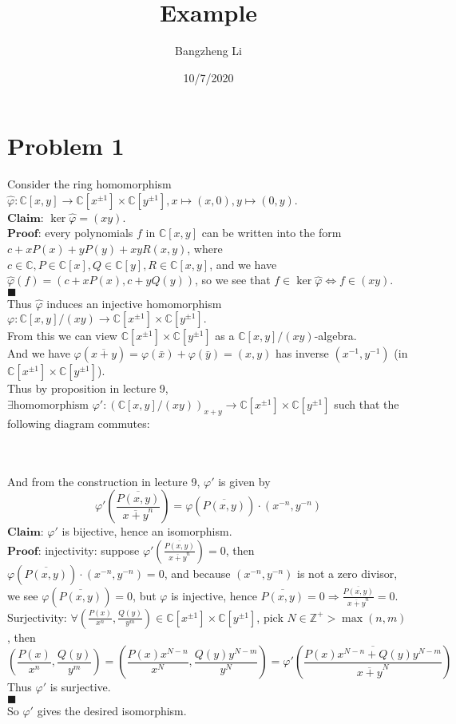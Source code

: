\documentclass{article}
\title{Example}
\author{Bangzheng Li}
\date{10/7/2020}
\newcommand{\inv}{^{-1}}
\newcommand{\Proof}{$\textbf{Proof: }$}
\newcommand{\Claim}{$\textbf{Claim: }$}
\newcommand{\CC}{\mathbb{C}}
\newcommand{\ZZ}{\mathbb{Z}}
\newcommand{\vp}{\varphi}
\newcommand{\pr}[1]{\left( #1\right)}
\begin{document}
\setcounter{section}{0}


\maketitle

\section{Problem 1}

Consider the ring homomorphism $\hat{\vp}:\CC[x,y]\rightarrow \CC[x^{\pm 1}]\times \CC[y^{\pm 1}],x\mapsto (x,0),y\mapsto (0,y)$.\\
\Claim $\ker\hat{\vp}=(xy)$.\\
\Proof every polynomials $f$ in $\CC[x,y]$ can be written into the form $c+xP(x)+yP(y)+xyR(x,y)$, where $c\in\CC,P\in\CC[x],Q\in\CC[y],R\in\CC[x,y]$, and we have $\hat{\vp}(f)=(c+xP(x),c+yQ(y))$, so we see that $f\in \ker\hat{\vp}\Leftrightarrow f\in (xy)$.\\
$\blacksquare$\\
Thus $\hat{\vp}$ induces an injective homomorphism $\vp:\CC[x,y]/(xy)\rightarrow \CC[x^{\pm 1}]\times \CC[y^{\pm 1}].$\\
From this we can view $\CC[x^{\pm 1}]\times \CC[y^{\pm 1}]$ as a $\CC[x,y]/(xy)$-algebra.\\
And we have $\vp(\overline{x+y})=\vp(\bar{x})+\vp(\bar{y})=(x,y)$ has inverse $(x\inv,y\inv)$ (in $\CC[x^{\pm 1}]\times \CC[y^{\pm 1}]$).\\
Thus by proposition in lecture 9, $\exists \text{homomorphism }\vp':(\CC[x,y]/(xy))_{x+y}\rightarrow \CC[x^{\pm 1}]\times \CC[y^{\pm 1}]$ such that the following diagram commutes:\\

\\ \\
And from the construction in lecture 9, $\vp'$ is given by
$$\vp'\pr{\frac{\overline{P(x,y)}}{\overline{x+y}^n}}=\vp\pr{\overline{P(x,y)}}\cdot (x^{-n},y^{-n})$$
\Claim $\vp'$ is bijective, hence an isomorphism.\\
\Proof injectivity: suppose $\vp'\pr{\frac{\overline{P(x,y)}}{\overline{x+y}^n}}=0$, then $\vp\pr{\overline{P(x,y)}}\cdot (x^{-n},y^{-n})=0$, and because $(x^{-n},y^{-n})$ is not a zero divisor, we see $\vp\pr{\overline{P(x,y)}}=0$, but $\vp$ is injective, hence $\overline{P(x,y)}=0\Rightarrow \frac{\overline{P(x,y)}}{\overline{x+y}^n}=0.$\\
Surjectivity: $\forall \pr{\frac{P(x)}{x^n},\frac{Q(y)}{y^m}}\in \CC[x^{\pm 1}]\times \CC[y^{\pm 1}]$, pick $N\in\ZZ^+>\max(n,m)$, then
$$\pr{\frac{P(x)}{x^n},\frac{Q(y)}{y^m}}=\pr{\frac{P(x)x^{N-n}}{x^N},\frac{Q(y)y^{N-m}}{y^N}}=\vp'\pr{\frac{\overline{P(x)x^{N-n}+Q(y)y^{N-m}}}{\overline{x+y}^N}}$$
Thus $\vp'$ is surjective.\\
$\blacksquare$\\
So $\vp'$ gives the desired isomorphism.
\end{document}
